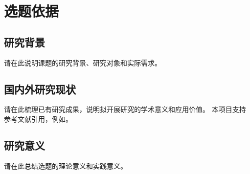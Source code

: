 \chapter{选题依据}
\section{研究背景}
请在此说明课题的研究背景、研究对象和实际需求。
\section{国内外研究现状}
请在此梳理已有研究成果，说明拟开展研究的学术意义和应用价值。
本项目支持参考文献引用，例如\cite{latexproject}。
\section{研究意义}
请在此总结选题的理论意义和实践意义。
